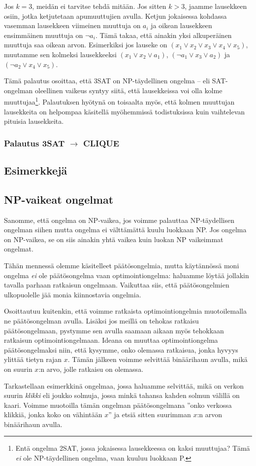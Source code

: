 Jos $k=3$, meidän ei tarvitse tehdä mitään. Jos sitten $k>3$,
jaamme lausekkeen osiin, jotka ketjutetaan apumuuttujien avulla.
Ketjun jokaisessa kohdassa vasemman lausekkeen viimeinen
muuttuja on $a_i$ ja oikean lausekkeen ensimmäinen muuttuja on $\neg a_i$.
Tämä takaa, että ainakin yksi alkuperäinen muuttuja saa oikean arvon.
Esimerkiksi jos lauseke on $(x_1 \lor x_2 \lor x_3 \lor x_4 \lor x_5)$,
muutamme sen kolmeksi lausekkeeksi $(x_1 \lor x_2 \lor a_1)$,
$(\neg a_1 \lor x_3 \lor a_2)$ ja $(\neg a_2 \lor x_4 \lor x_5)$.

Tämä palautus osoittaa, että 3SAT on NP-täydellinen ongelma --
eli SAT-ongelman oleellinen vaikeus syntyy siitä, että lausekkeissa
voi olla kolme muuttujaa\footnote{Entä ongelma 2SAT, jossa jokaisessa lausekkeessa
on kaksi muuttujaa? Tämä \emph{ei} ole NP-täydellinen ongelma,
vaan kuuluu luokkaan P.}.
Palautuksen hyötynä on toisaalta myös, että kolmen muuttujan lausekkeita
on helpompaa käsitellä myöhemmissä todistuksissa
kuin vaihtelevan pituisia lausekkeita.


\subsubsection{Palautus 3SAT $\rightarrow$ CLIQUE}

\subsection{Esimerkkejä}

\subsection{NP-vaikeat ongelmat}

Sanomme, että ongelma on NP-vaikea, jos voimme palauttaa
NP-täydellisen ongelman siihen mutta ongelma ei välttämättä
kuulu luokkaan NP.
Jos ongelma on NP-vaikea, se on siis ainakin yhtä vaikea
kuin luokan NP vaikeimmat ongelmat.

Tähän mennessä olemme käsitelleet päätösongelmia,
mutta käytännössä moni ongelma \emph{ei} ole päätösongelma
vaan optimointiongelma: haluamme löytää jollakin
tavalla parhaan ratkaisun ongelmaan.
Vaikuttaa siis, että päätöson\-gelmien ulkopuolelle jää
monia kiinnostavia ongelmia.

Osoittautuu kuitenkin, että voimme ratkaista optimointiongelmia
muotoilemalla ne päätösongelman avulla.
Lisäksi jos meillä on tehokas ratkaisu päätösongelmaan,
pystymme sen avulla saamaan aikaan myös tehokkaan
ratkaisun optimointiongelmaan.
Ideana on muuttaa optimointiongelma päätös\-ongelmaksi niin,
että kysymme, onko olemassa ratkaisua, jonka hyvyys ylittää
tietyn rajan $x$. Tämän jälkeen voimme selvittää binäärihaun
avulla, mikä on suurin $x$:n arvo, jolle ratkaisu on olemassa.

Tarkastellaan esimerkkinä ongelmaa, jossa haluamme selvittää,
mikä on verkon suurin \emph{klikki} eli joukko solmuja,
jossa minkä tahansa kahden solmun välillä on kaari.
Voimme muotoilla tämän ongelman päätösongelmana
''onko verkossa klikkiä, jonka koko on vähintään $x$''
ja etsiä sitten suurimman $x$:n arvon binäärihaun avulla.